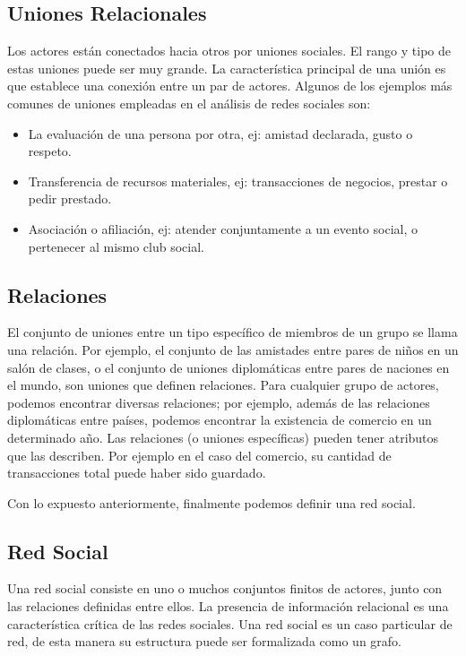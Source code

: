 \subsection{Uniones Relacionales} %
\label{sub:uniones_relacionales}
Los actores están conectados hacia otros por uniones sociales. El rango y tipo de estas uniones puede ser muy grande. La característica principal de una unión es que establece una conexión entre un par de actores. Algunos de los ejemplos más comunes de uniones empleadas en el análisis de redes sociales son:

  \begin{itemize}
    \item La evaluación de una persona por otra, ej: amistad declarada, gusto o respeto.
    \item Transferencia de recursos materiales, ej: transacciones de negocios, prestar o pedir prestado.
    \item Asociación o afiliación, ej: atender conjuntamente a un evento social, o pertenecer al mismo club social.
  \end{itemize}

\subsection{Relaciones} %
\label{sub:relaciones}
El conjunto de uniones entre un tipo específico de miembros de un grupo se llama una relación. Por ejemplo, el conjunto de las amistades entre pares de niños en un salón de clases, o el conjunto de uniones diplomáticas entre pares de naciones en el mundo, son uniones que definen relaciones. Para cualquier grupo de actores, podemos encontrar diversas relaciones; por ejemplo, además de las relaciones diplomáticas entre países, podemos encontrar la existencia de comercio en un determinado año. Las relaciones (o uniones específicas) pueden tener atributos que las describen. Por ejemplo en el caso del comercio, su cantidad de transacciones total puede haber sido guardado.

Con lo expuesto anteriormente, finalmente podemos definir una red social.

\subsection{Red Social} %
\label{sub:red_social}
Una red social consiste en uno o muchos conjuntos finitos de actores, junto con las relaciones definidas entre ellos. La presencia de información relacional es una característica crítica de las redes sociales. Una red social es un caso particular de red, de esta manera su estructura puede ser formalizada como un grafo.

